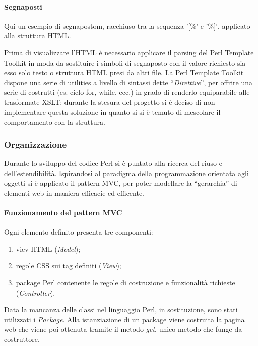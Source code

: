 \paragraph*{Segnaposti} Qui un esempio di segnapostom, racchiuso tra la sequenza '[\%' e '\%]', applicato alla struttura HTML. 

Prima di visualizzare l'HTML \`e necessario applicare il parsing del Perl Template Toolkit in moda da sostituire i simboli di segnaposto con il valore richiesto sia esso solo testo o struttura HTML presi da altri file.
La Perl Template Toolkit dispone una serie di utilities a livello di sintassi dette ``\textit{Direttive}'', per offrire una serie di costrutti (es. ciclo for, while, ecc.) in grado di renderlo equiparabile alle trasformate XSLT: durante la stesura del progetto si \`e deciso di non implementare questa soluzione in quanto si si \`e temuto di mescolare il comportamento con la struttura.


\subsubsection{Organizzazione}
Durante lo sviluppo del codice Perl si \`e puntato alla ricerca del riuso e dell'estendibilit\`a. Ispirandosi al paradigma della programmazione orientata agli oggetti si \`e applicato il pattern MVC, per poter modellare la ``gerarchia'' di elementi web in maniera efficacie ed efficente.

\paragraph*{Funzionamento del pattern MVC}Ogni elemento definito presenta tre componenti:
\begin{enumerate}
    \item viev HTML (\textit{Model});
    \item regole CSS sui tag definiti (\textit{View});
    \item package Perl contenente le regole di costruzione e funzionalit\`a richieste (\textit{Controller}).
\end{enumerate}

Data la mancanza delle classi nel linguaggio Perl, in sostituzione, sono stati utilizzati i \textit{Package}. Alla istanziazione di un package viene costruita la pagina web che viene poi ottenuta tramite il metodo \textit{get}, unico metodo che funge da costruttore.

